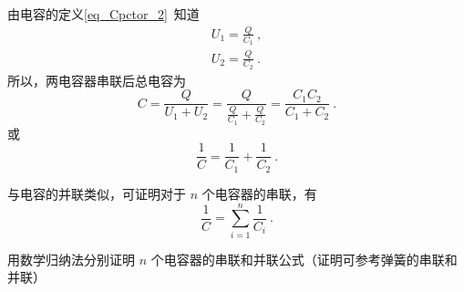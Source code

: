 由电容的定义\autoref{eq_Cpctor_2}~知道
\begin{equation}
\begin{aligned}
U_1=\frac{Q}{C_1}~,\\
U_2=\frac{Q}{C_2}~.
\end{aligned}
\end{equation}
所以，两电容器串联后总电容为
\begin{equation}
{C} = \frac{Q}{U_1+U_2} = \frac{Q}{\frac{Q}{C_1}+\frac{Q}{C_2}} = \frac{C_1C_2}{C_1 + C_2}~.
\end{equation}
或
\begin{equation}
\frac{1}{C}=\frac{1}{C_1}+\frac{1}{C_2}~.
\end{equation}

与电容的并联类似，可证明对于 $n$ 个电容器的串联，有
\begin{equation}
\frac{1}{C}=\sum_{i=1}^{n}\frac{1}{C_i}~.
\end{equation}
\begin{exercise}{}
用数学归纳法分别证明 $n$ 个电容器的串联和并联公式（证明可参考弹簧的串联和并联）
\end{exercise}
